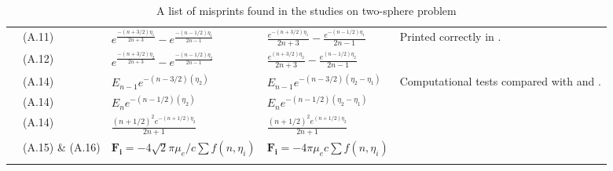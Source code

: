 \documentclass[../thesis.tex]{subfiles}
\begin{document}
\begin{landscape}
\begin{longtable}{p{3cm}p{3cm}p{5.0cm}p{5.25cm}p{5.5cm}}
 \multirow[t]{6}{3cm}{\citet{RSD22}} & (A.11) & $e^{\frac{-(n+3/2)\eta_1}{2n+3}}-e^{\frac{-(n-1/2)\eta_1}{2n-1}}$ & $\frac{e^{-(n+3/2)\eta_1}}{2n+3}-\frac{e^{-(n-1/2)\eta_1}}{2n-1}$ & \multirow[c]{2}{5.5cm}{Printed correctly in \cite{R09}.}
 \\ \cline{2-4}
 & (A.12) & $e^{\frac{-(n+3/2)\eta_2}{2n+3}}-e^{\frac{-(n-1/2)\eta_2}{2n-1}}$ & $\frac{e^{(n+3/2)\eta_2}}{2n+3}-\frac{e^{(n-1/2)\eta_2}}{2n-1}$ & 
 \\ \cline{2-5}
 & (A.14) & $E_{n-1}e^{-(n-3/2)(\eta_2)}$ & $E_{n-1}e^{-(n-3/2)(\eta_2-\eta_1)}$ & \multirow[t]{4}{5.5cm}{Computational tests compared with \cite{HHS73} and \cite{RM74}.}
 \\ \cline{2-4}
 & (A.14) & $E_{n}e^{-(n-1/2)(\eta_2)}$ & $E_{n}e^{-(n-1/2)(\eta_2-\eta_1)}$ &
 \\ \cline{2-4}
 & (A.14) & $\frac{(n+1/2)^2 e^{-(n+1/2)\eta_2}}{2n+1}$ & $\frac{(n+1/2)^2 e^{(n+1/2)\eta_2}}{2n+1}$ &
 \\ \cline{2-4}
 & (A.15) \& (A.16) & $\boldsymbol{F_i}=-4\sqrt{2}\pi\mu_e/c \sum f(n,\eta_i)$ & $\boldsymbol{F_i}=-4\pi\mu_e c \sum f(n,\eta_i)$ &
 \\ \hline
\caption{A list of misprints found in the studies on two-sphere problem}
\label{tab:misprints}
\end{longtable}%

\end{landscape}
\end{document}
